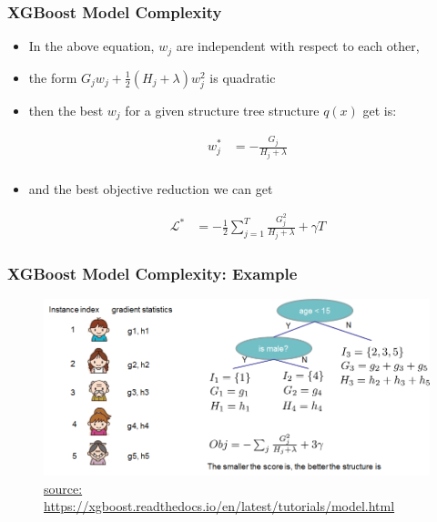 \documentclass[
  shownotes,
  xcolor={svgnames},
  hyperref={colorlinks,citecolor=DarkBlue,linkcolor=DarkRed,urlcolor=DarkBlue}
  , aspectratio=169]{beamer}
\begin{document}
\begin{frame}[fragile]
\frametitle{XGBoost Model Complexity}

\begin{itemize}
\item In the above equation, $w_j$ are independent with respect to each other, 
\item the form $G_jw_j+\frac{1}{2}(H_j+\lambda)w_j^2$  is quadratic 
\item then the best $w_j$ for a given structure tree structure $q(x)$ get is:


\begin{align}
w_j^\ast &= -\frac{G_j}{H_j+\lambda}\\
\end{align}


\item and the best objective reduction we can get

\begin{align}
\mathcal{L}^\ast &= -\frac{1}{2} \sum_{j=1}^T \frac{G_j^2}{H_j+\lambda} + \gamma T
\end{align}

\end{itemize}



\end{frame}
\begin{frame}[fragile]
\frametitle{XGBoost Model Complexity: Example}
  \begin{figure}[H] \centering
            \captionsetup{justification=centering}
              \includegraphics[scale=0.6]{figures/struct_score}
              \\
              \tiny
              \url{source: https://xgboost.readthedocs.io/en/latest/tutorials/model.html}
 \end{figure}

 \end{frame}
\end{document}
